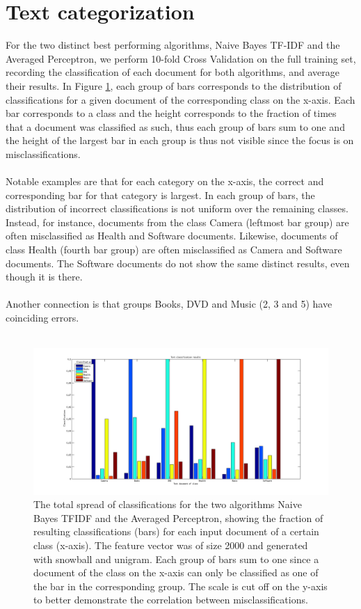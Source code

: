 \section{Text categorization}
For the two distinct best performing algorithms, Naive Bayes TF-IDF and the Averaged Perceptron, we perform 10-fold Cross Validation on the full training set, recording the classification of each document for both algorithms, and average their results. In Figure \ref{fig:textcategorization}, each group of bars corresponds to the distribution of classifications for a given document of the corresponding class on the x-axis. Each bar corresponds to a class and the height corresponds to the fraction of times that a document was classified as such, thus each group of bars sum to one and the height of the largest bar in each group is thus not visible since the focus is on misclassifications.
\\\\
Notable examples are that for each category on the x-axis, the correct and corresponding bar for that category is largest. In each group of bars, the distribution of incorrect classifications is not uniform over the remaining classes. Instead, for instance, documents from the class Camera (leftmost bar group) are often misclassified as Health and Software documents. Likewise, documents of class Health (fourth bar group) are often misclassified as Camera and Software documents. The Software documents do not show the same distinct results, even though it is there.
\\\\
Another connection is that groups Books, DVD and Music (2, 3 and 5) have coinciding errors.\\\\
\begin{figure}[h!]
	\centering
	\includegraphics[width=1\linewidth]{../Plottar/text_categorization.png}
	\caption{The total spread of classifications for the two algorithms Naive Bayes TFIDF and the Averaged Perceptron, showing the fraction of resulting classifications (bars) for each input document of a certain class (x-axis). The feature vector was of size 2000 and generated with snowball and unigram. Each group of bars sum to one since a document of the class on the x-axis can only be classified as one of the bar in the corresponding group. The scale is cut off on the y-axis to better demonstrate the correlation between misclassifications.}
	\label{fig:textcategorization}
\end{figure}  



